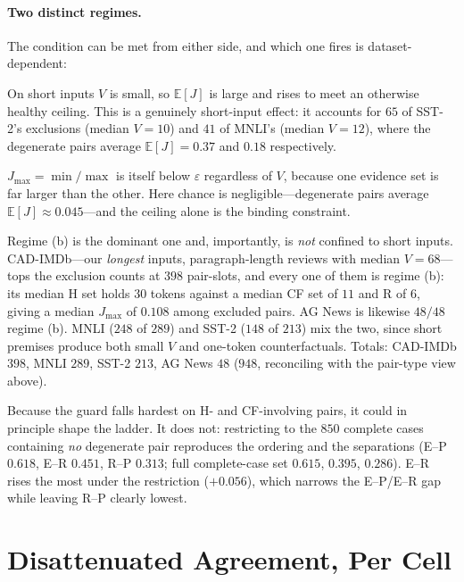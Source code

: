 \documentclass[11pt]{article}
\begin{document}
\paragraph{Two distinct regimes.} The condition can be met from either side, and which one fires is dataset-dependent:

\begin{description}[leftmargin=1em,itemsep=1pt,topsep=2pt]
\item[(a) Small vocabulary.] On short inputs $V$ is small, so $\mathbb{E}[J]$ is large and rises to meet an otherwise healthy ceiling. This is a genuinely short-input effect: it accounts for $65$ of SST-2's exclusions (median $V=10$) and $41$ of MNLI's (median $V=12$), where the degenerate pairs average $\mathbb{E}[J]=0.37$ and $0.18$ respectively.
\item[(b) Extreme size imbalance.] $J_{\max}=\min/\max$ is itself below $\varepsilon$ regardless of $V$, because one evidence set is far larger than the other. Here chance is negligible---degenerate pairs average $\mathbb{E}[J]\approx0.045$---and the ceiling alone is the binding constraint.
\end{description}

Regime (b) is the dominant one and, importantly, is \emph{not} confined to short inputs. CAD-IMDb---our \emph{longest} inputs, paragraph-length reviews with median $V=68$---tops the exclusion counts at $398$ pair-slots, and every one of them is regime (b): its median H set holds $30$ tokens against a median CF set of $11$ and R of $6$, giving a median $J_{\max}$ of $0.108$ among excluded pairs. AG News is likewise $48/48$ regime (b). MNLI ($248$ of $289$) and SST-2 ($148$ of $213$) mix the two, since short premises produce both small $V$ and one-token counterfactuals. Totals: CAD-IMDb $398$, MNLI $289$, SST-2 $213$, AG News $48$ ($948$, reconciling with the pair-type view above).

Because the guard falls hardest on H- and CF-involving pairs, it could in principle shape the ladder. It does not: restricting to the $850$ complete cases containing \emph{no} degenerate pair reproduces the ordering and the separations (E--P $0.618$, E--R $0.451$, R--P $0.313$; full complete-case set $0.615$, $0.395$, $0.286$). E--R rises the most under the restriction ($+0.056$), which narrows the E--P/E--R gap while leaving R--P clearly lowest.

\section{Disattenuated Agreement, Per Cell}
\label{app:disatt}
\end{document}
